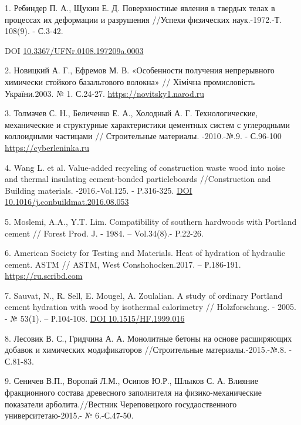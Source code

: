 \begin{references}
1. Ребиндер П. А., Щукин Е. Д. Поверхностные явления в твердых телах в
процессах их деформации и разрушения //Успехи физических наук.-1972.-Т.
108(9). - С.3-42.

DOI
\href{https://doi.org/10.3367/UFNr.0108.197209a.0003}{10.3367/UFNr.0108.197209a.0003}

2. Новицкий А. Г., Ефремов М. В. «Особенности получения непрерывного
химически стойкого базальтового волокна» // Хімічна промисловість
України.2003. № 1. С.24-27.
\href{https://novitsky1.narod.ru/basalt5.htm}{https://novitsky1.narod.ru}

3. Толмачев С. Н., Беличенко Е. А., Холодный А. Г. Технологические,
механические и структурные характеристики цементных систем с углеродными
коллоидными частицами // Строительные материалы. -2010.-№.9. - С.96-100
\href{https://cyberleninka.ru/article/n/tehnologicheskie-mehanicheskie-i-strukturnye-harakteristiki-tsementnyh-sistem-s-uglerodnymi-kolloidnymi-chastitsami}{https://cyberleninka.ru}

4. Wang L. et al. Value-added recycling of construction waste wood into
noise and thermal insulating cement-bonded particleboards //Construction
and Building materials. -2016.-Vol.125. - P.316-325.
\href{https://doi.org/10.1016/j.conbuildmat.2016.08.053}{DOI
10.1016/j.conbuildmat.2016.08.053}

5. Moslemi, A.A., Y.T. Lim. Compatibility of southern hardwoods with
Portland cement // Forest Prod. J. - 1984. -- Vol.34(8).- P.22-26.

6. American Society for Testing and Materials. Heat of hydration of
hydraulic cement. ASTM // ASTM, West Conshohocken.2017. -- Р.186-191.
\href{https://ru.scribd.com/document/526400532/C186}{https://ru.scribd.com}

7. Sauvat, N., R. Sell, E. Mougel, A. Zoulalian. A study of ordinary
Portland cement hydration with wood by isothermal calorimetry //
Holzforschung. - 2005. - № 53(1). -- Р.104-108.
\href{https://doi.org/10.1515/HF.1999.016}{DOI 10.1515/HF.1999.016}

8. Лесовик В. С., Гридчина А. А. Монолитные бетоны на основе расширяющих
добавок и химических модификаторов //Строительные материалы.-2015.-№.8.
- С.81-83.

9. Сеничев В.П., Воропай Л.М., Осипов Ю.Р., Шлыков С. А. Влияние
фракционного состава древесного заполнителя на физико-механические
показатели арболита.//Вестник Череповецкого госудаоственного
университетаю-2015.- № 6.-С.47-50.


\end{references}

